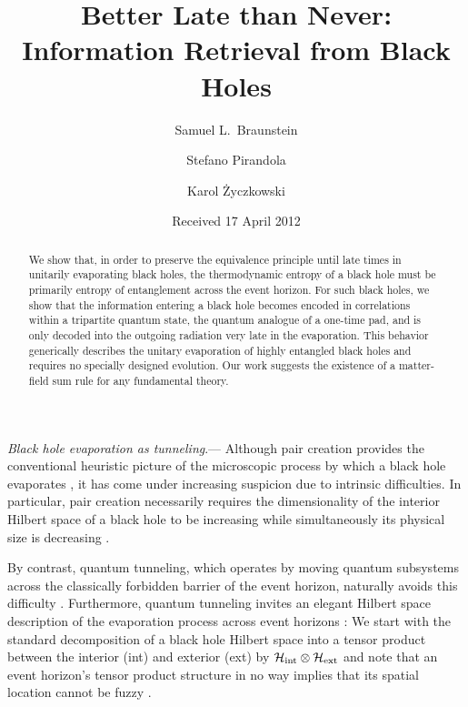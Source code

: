 \documentclass[twocolumn,aps,showpacs,prl]{revtex4}
\begin{document}
\title{Better Late than Never: Information Retrieval from Black Holes}
\author{Samuel L.\ Braunstein}
\author{Stefano Pirandola}
\author{Karol \.{Z}yczkowski}
\date{Received 17 April 2012}

\begin{abstract}
We show that, in order to preserve the equivalence principle until late
times in unitarily evaporating black holes, the thermodynamic entropy of
a black hole must be primarily entropy of entanglement across the event
horizon. For such black holes, we show that the information entering
a black hole becomes encoded in correlations within a tripartite
quantum state, the quantum analogue of a one-time pad, and is only
decoded into the outgoing radiation very late in the evaporation.
This behavior generically describes the unitary evaporation of highly
entangled black holes and requires no specially designed evolution.
Our work suggests the existence of a matter-field sum rule for any
fundamental theory.
\end{abstract}


\maketitle

{\it Black hole evaporation as tunneling}.---%
Although pair creation provides the conventional heuristic picture of
the microscopic process by which a black hole evaporates
\cite{Hawking75}, it has come under increasing suspicion due to intrinsic
difficulties. In particular, pair creation necessarily requires the
dimensionality of the interior Hilbert space of a black hole to
be increasing while simultaneously its physical size is
decreasing \cite{Nikolic,B10}.

By contrast, quantum tunneling, which operates by moving quantum
subsystems across the classically forbidden barrier of the event
horizon, naturally avoids this difficulty \cite{B10}. Furthermore,
quantum tunneling invites an elegant Hilbert space description of the
evaporation process across event horizons \cite{B10}: We start
with the standard decomposition of a black hole Hilbert space into a
tensor product between the interior (int) and exterior (ext) by
${\cal H}_{\text{int}}\otimes{\cal H}_{\text{ext}}$ \cite{Hawking76}
and note that an event horizon's tensor product structure in no
way implies that its spatial location cannot be fuzzy \cite{B10}.
\end{document}
